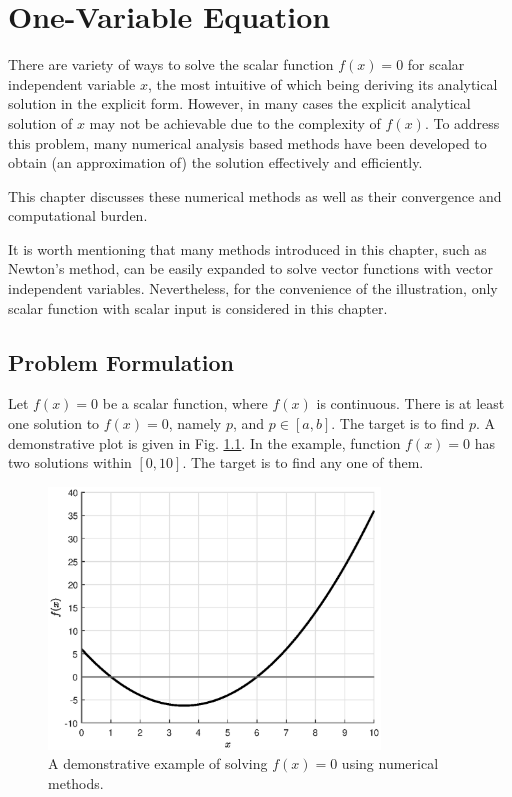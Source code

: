 \chapter{One-Variable Equation}

There are variety of ways to solve the scalar function $f(x)=0$ for scalar independent variable $x$, the most intuitive of which being deriving its analytical solution in the explicit form. However, in many cases the explicit analytical solution of $x$ may not be achievable due to the complexity of $f(x)$. To address this problem, many numerical analysis based methods have been developed to obtain (an approximation of) the solution effectively and efficiently.

This chapter discusses these numerical methods as well as their convergence and computational burden.

It is worth mentioning that many methods introduced in this chapter, such as Newton's method, can be easily expanded to solve vector functions with vector independent variables. Nevertheless, for the convenience of the illustration, only scalar function with scalar input is considered in this chapter.

\section{Problem Formulation}

Let $f(x)=0$ be a scalar function, where $f(x)$ is continuous. There is at least one solution to $f(x)=0$, namely $p$, and $p\in \left[a, b\right]$. The target is to find $p$. A demonstrative plot is given in Fig. \ref{fig:part-5:onevarproblemformulation}. In the example, function $f(x)=0$ has two solutions within $\left[0, 10\right]$. The target is to find any one of them.

\begin{figure}[!htbp]
\centering
\includegraphics[width=250pt]{chapters/part-5/figures/demo_problem_formulation.eps}
\caption{A demonstrative example of solving $f(x)=0$ using numerical methods.} \label{fig:part-5:onevarproblemformulation}
\end{figure} 

